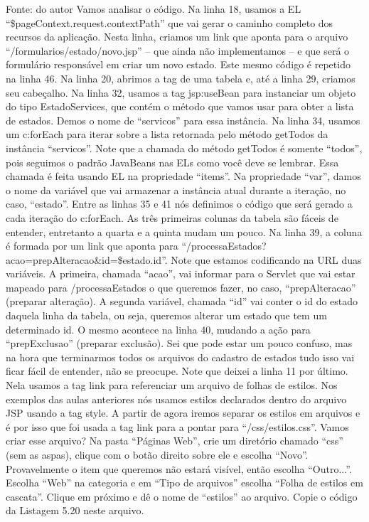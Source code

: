 Fonte: do autor
Vamos analisar o código. Na linha 18, usamos a EL “\${pageContext.request.contextPath}” que vai gerar o caminho completo dos recursos da aplicação. Nesta linha, criamos um link que aponta para o arquivo “/formularios/estado/novo.jsp” – que ainda não implementamos – e que será o formulário responsável em criar um novo estado. Este mesmo código é repetido na linha 46. Na linha 20, abrimos a tag de uma tabela e, até a linha 29, criamos seu cabeçalho. Na linha 32, usamos a tag jsp:useBean para instanciar um objeto do tipo EstadoServices, que contém o método que vamos usar para obter a lista de estados. Demos o nome de “servicos” para essa instância. Na linha 34, usamos um c:forEach para iterar sobre a lista retornada pelo método getTodos da instância “servicos”. Note que a chamada do método getTodos é somente “todos”, pois seguimos o padrão JavaBeans nas ELs como você deve se lembrar. Essa chamada é feita usando EL na propriedade “items”. Na propriedade “var”, damos o nome da variável que vai armazenar a instância atual durante a iteração, no caso, “estado”. Entre as linhas 35 e 41 nós definimos o código que será gerado a cada iteração do c:forEach. As três primeiras colunas da tabela são fáceis de entender, entretanto a quarta e a quinta mudam um pouco. Na linha 39, a coluna é formada por um link que aponta para “/processaEstados?acao=prepAlteracao\&id=\${estado.id}”. Note que estamos codificando na URL duas variáveis. A primeira, chamada “acao”, vai informar para o Servlet que vai estar mapeado para /processaEstados o que queremos fazer, no caso, “prepAlteracao” (preparar alteração). A segunda variável, chamada “id” vai conter o id do estado daquela linha da tabela, ou seja, queremos alterar um estado que tem um determinado id. O mesmo acontece na linha 40, mudando a ação para “prepExclusao” (preparar exclusão). Sei que pode estar um pouco confuso, mas na hora que terminarmos todos os arquivos do cadastro de estados tudo isso vai ficar fácil de entender, não se preocupe.
Note que deixei a linha 11 por último. Nela usamos a tag link para referenciar um arquivo de folhas de estilos. Nos exemplos das aulas anteriores nós usamos estilos declarados dentro do arquivo JSP usando a tag style. A partir de agora iremos separar os estilos em arquivos e é por isso que foi usada a tag link para a pontar para “/css/estilos.css”. Vamos criar esse arquivo? Na pasta “Páginas Web”, crie um diretório chamado “css” (sem as aspas), clique com o botão direito sobre ele e escolha “Novo”. Provavelmente o item que queremos não estará visível, então escolha “Outro...”. Escolha “Web” na categoria e em “Tipo de arquivos” escolha “Folha de estilos em cascata”. Clique em próximo e dê o nome de “estilos” ao arquivo. Copie o código da Listagem 5.20 neste arquivo.








